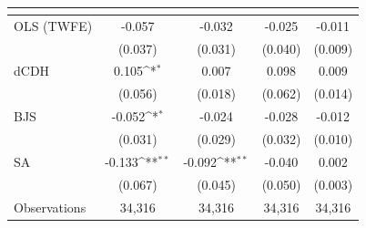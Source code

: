 {
\def\sym#1{\ifmmode^{#1}\else\(^{#1}\)\fi}
\begin{tabular}{l*{4}{c}}
\toprule
            &&&&\\
\midrule
OLS (TWFE) & -0.057 & -0.032 & -0.025 & -0.011 \\
             & (0.037) & (0.031) & (0.040) & (0.009) \\
dCDH & 0.105\sym{*} & 0.007 & 0.098 & 0.009 \\
             & (0.056) & (0.018) & (0.062) & (0.014) \\
BJS & -0.052\sym{*} & -0.024 & -0.028 & -0.012 \\
             & (0.031) & (0.029) & (0.032) & (0.010) \\
SA & -0.133\sym{**} & -0.092\sym{**} & -0.040 & 0.002 \\
             & (0.067) & (0.045) & (0.050) & (0.003) \\
\midrule
Observations & 34,316 & 34,316 & 34,316 & 34,316 \\
\bottomrule
\end{tabular}
}
